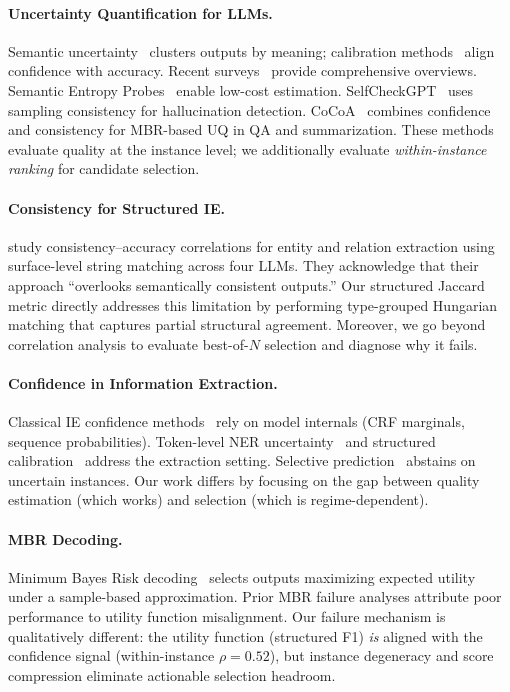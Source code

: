 \documentclass[11pt,a4paper]{article}
\begin{document}
\paragraph{Uncertainty Quantification for LLMs.}
Semantic uncertainty~\citep{kuhn2023semantic} clusters outputs by meaning; calibration methods~\citep{guo2017calibration,kadavath2022language,desai2020calibration} align confidence with accuracy.
Recent surveys~\citep{uqsurvey2025acl,uqcalibsurvey2025} provide comprehensive overviews.
Semantic Entropy Probes~\citep{semanticprobes2024} enable low-cost estimation.
SelfCheckGPT~\citep{manakul2023selfcheckgpt} uses sampling consistency for hallucination detection.
CoCoA~\citep{cocoa2025neurips} combines confidence and consistency for MBR-based UQ in QA and summarization.
These methods evaluate quality at the instance level; we additionally evaluate \emph{within-instance ranking} for candidate selection.

\paragraph{Consistency for Structured IE.}
\citet{nedellec2026consistency} study consistency--accuracy correlations for entity and relation extraction using surface-level string matching across four LLMs.
They acknowledge that their approach ``overlooks semantically consistent outputs.''
Our structured Jaccard metric directly addresses this limitation by performing type-grouped Hungarian matching that captures partial structural agreement.
Moreover, we go beyond correlation analysis to evaluate best-of-$N$ selection and diagnose why it fails.

\paragraph{Confidence in Information Extraction.}
Classical IE confidence methods~\citep{culotta2004confidence} rely on model internals (CRF marginals, sequence probabilities).
Token-level NER uncertainty~\citep{xiao2019quantifying,shelmanov2021certain,he2020towards} and structured calibration~\citep{kuleshov2015calibrated,jagannatha2022calibrating} address the extraction setting.
Selective prediction~\citep{geifman2017selective,knowyourlimits2025tacl} abstains on uncertain instances.
Our work differs by focusing on the gap between quality estimation (which works) and selection (which is regime-dependent).

\paragraph{MBR Decoding.}
Minimum Bayes Risk decoding~\citep{eikema2022map} selects outputs maximizing expected utility under a sample-based approximation.
Prior MBR failure analyses attribute poor performance to utility function misalignment.
Our failure mechanism is qualitatively different: the utility function (structured F1) \emph{is} aligned with the confidence signal (within-instance $\rho{=}0.52$), but instance degeneracy and score compression eliminate actionable selection headroom.
\end{document}
